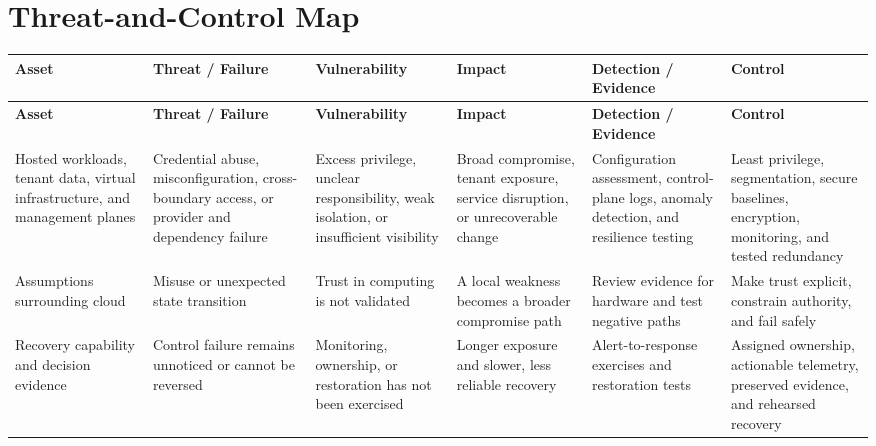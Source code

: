 \documentclass[11pt,letterpaper]{article}
\begin{document}
\section*{Threat-and-Control Map}
\begingroup\scriptsize\setlength{\tabcolsep}{2pt}
\begin{longtable}{>{\raggedright\arraybackslash}p{}>{\raggedright\arraybackslash}p{}>{\raggedright\arraybackslash}p{}>{\raggedright\arraybackslash}p{}>{\raggedright\arraybackslash}p{}>{\raggedright\arraybackslash}p{}}
\toprule\rowcolor{Navy}\color{white}\textbf{Asset} & \color{white}\textbf{Threat / Failure} & \color{white}\textbf{Vulnerability} & \color{white}\textbf{Impact} & \color{white}\textbf{Detection / Evidence} & \color{white}\textbf{Control}\\\midrule
\endfirsthead
\toprule\rowcolor{Navy}\color{white}\textbf{Asset} & \color{white}\textbf{Threat / Failure} & \color{white}\textbf{Vulnerability} & \color{white}\textbf{Impact} & \color{white}\textbf{Detection / Evidence} & \color{white}\textbf{Control}\\\midrule
\endhead
Hosted workloads, tenant data, virtual infrastructure, and management planes & Credential abuse, misconfiguration, cross-boundary access, or provider and dependency failure & Excess privilege, unclear responsibility, weak isolation, or insufficient visibility & Broad compromise, tenant exposure, service disruption, or unrecoverable change & Configuration assessment, control-plane logs, anomaly detection, and resilience testing & Least privilege, segmentation, secure baselines, encryption, monitoring, and tested redundancy\\\midrule
Assumptions surrounding cloud & Misuse or unexpected state transition & Trust in computing is not validated & A local weakness becomes a broader compromise path & Review evidence for hardware and test negative paths & Make trust explicit, constrain authority, and fail safely\\\midrule
Recovery capability and decision evidence & Control failure remains unnoticed or cannot be reversed & Monitoring, ownership, or restoration has not been exercised & Longer exposure and slower, less reliable recovery & Alert-to-response exercises and restoration tests & Assigned ownership, actionable telemetry, preserved evidence, and rehearsed recovery\\\midrule
\bottomrule
\end{longtable}
\endgroup
\end{document}
